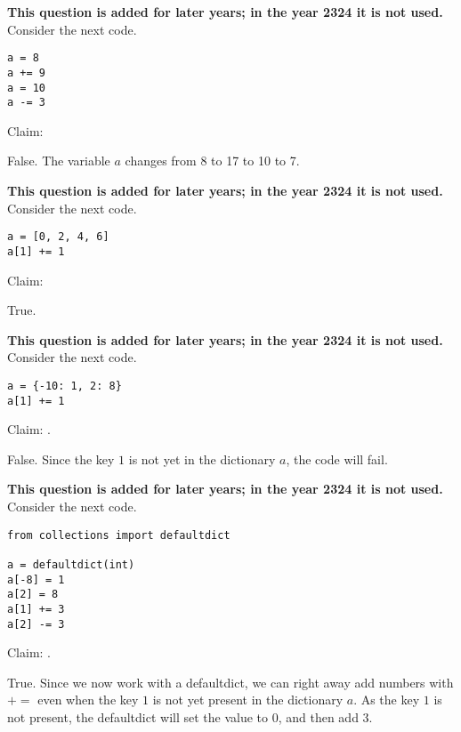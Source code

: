 \documentclass[stochastic-or.tex]{subfiles}
\begin{document}
\begin{truefalse} \textbf{This question is added for later years; in the year 2324 it is not used.}
Consider the next code.
\begin{verbatim}
a = 8
a += 9
a = 10
a -= 3
\end{verbatim}
Claim:  
\begin{solution}
False. The variable $a$ changes from 8 to 17 to 10 to 7.
\end{solution}
\end{truefalse}

\begin{truefalse} \textbf{This question is added for later years; in the year 2324 it is not used.}
Consider the next code.
\begin{verbatim}
a = [0, 2, 4, 6]
a[1] += 1
\end{verbatim}
Claim:  
\begin{solution}
True.
\end{solution}
\end{truefalse}

\begin{truefalse} \textbf{This question is added for later years; in the year 2324 it is not used.}
Consider the next code.
\begin{verbatim}
a = {-10: 1, 2: 8}
a[1] += 1
\end{verbatim}
Claim:  .
\begin{solution}
False. Since the key $1$ is not yet in the dictionary $a$, the code will fail.
\end{solution}
\end{truefalse}

\begin{truefalse} \textbf{This question is added for later years; in the year 2324 it is not used.}
Consider the next code.
\begin{verbatim}
from collections import defaultdict

a = defaultdict(int)
a[-8] = 1
a[2] = 8
a[1] += 3
a[2] -= 3
\end{verbatim}
Claim:  .
\begin{solution}
True. Since we now work with a defaultdict, we can right away add numbers with $+=$ even when the key $1$ is not yet present in the dictionary $a$. As the key $1$  is not present, the defaultdict will set the value to 0, and then add 3.
\end{solution}
\end{truefalse}
\end{document}
